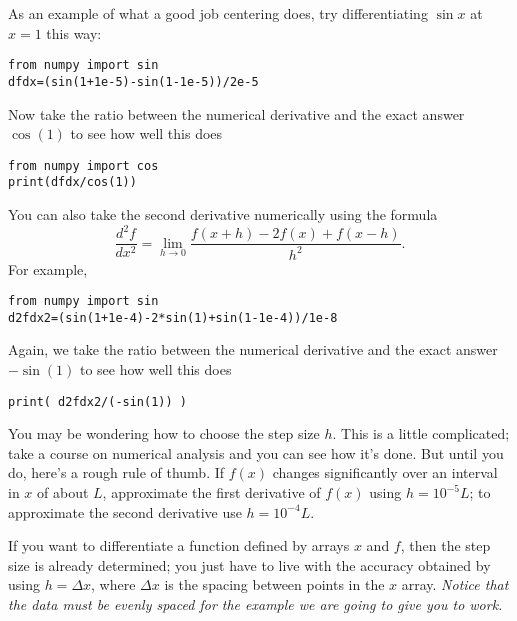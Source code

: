 As an example of what a good job centering does, try differentiating
$\sin{x}$ at $x=1$ this way:
\begin{Verbatim}
from numpy import sin
dfdx=(sin(1+1e-5)-sin(1-1e-5))/2e-5
\end{Verbatim}
Now take the ratio between the numerical derivative and the exact answer
$\cos(1)$ to see how well this does
\begin{Verbatim}
from numpy import cos
print(dfdx/cos(1))
\end{Verbatim}
You can also take the second derivative numerically using the formula
\begin{equation}
\frac{d^2 f }{ dx^2} = \lim_{ h \rightarrow 0}
\frac{f(x+h)-2 f(x)+f(x-h) }{ h^2} .
\end{equation}
For example,
\begin{Verbatim}
from numpy import sin
d2fdx2=(sin(1+1e-4)-2*sin(1)+sin(1-1e-4))/1e-8
\end{Verbatim}
Again, we take the ratio between the numerical derivative and the exact
answer $-\sin(1)$ to see how well this does
\begin{Verbatim}
print( d2fdx2/(-sin(1)) )
\end{Verbatim}

You may be wondering how to choose the step size $h$. This is a little
complicated; take a course on numerical analysis and you can see how it's
done. But until you do, here's a rough rule of thumb. If $f(x)$ changes
significantly over an interval in $x$ of about $L$, approximate the first
derivative of $f(x)$ using $h=10^{-5}L$; to approximate the second derivative
use $h=10^{-4}L$.

 If you want to differentiate a function
defined by arrays $x$ and $f$, then the step size is already determined; you
just have to live with the accuracy obtained by using $h=\Delta x$, where
$\Delta x$ is the spacing between points in the $x$ array.  {\it Notice that
the data must be evenly spaced for the example we are going to give you to
work.}

